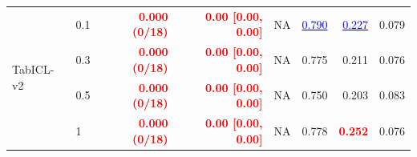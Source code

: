 \begin{table}[pos=!htbp,align=\centering]
{\begin{tabular}{llrrrrrr}
\midrule
\multirow{4}{*}{TabICL-v2} & 0.1 & \textcolor{red}{\textbf{0.000 (0/18)}} & \textcolor{red}{\textbf{0.00 [0.00, 0.00]}} & NA & \textcolor{blue}{\underline{0.790}} & \textcolor{blue}{\underline{0.227}} & 0.079 \\
 & 0.3 & \textcolor{red}{\textbf{0.000 (0/18)}} & \textcolor{red}{\textbf{0.00 [0.00, 0.00]}} & NA & 0.775 & 0.211 & 0.076 \\
 & 0.5 & \textcolor{red}{\textbf{0.000 (0/18)}} & \textcolor{red}{\textbf{0.00 [0.00, 0.00]}} & NA & 0.750 & 0.203 & 0.083 \\
 & 1 & \textcolor{red}{\textbf{0.000 (0/18)}} & \textcolor{red}{\textbf{0.00 [0.00, 0.00]}} & NA & 0.778 & \textcolor{red}{\textbf{0.252}} & 0.076 \\
\bottomrule
\end{tabular}
}
\end{table}
